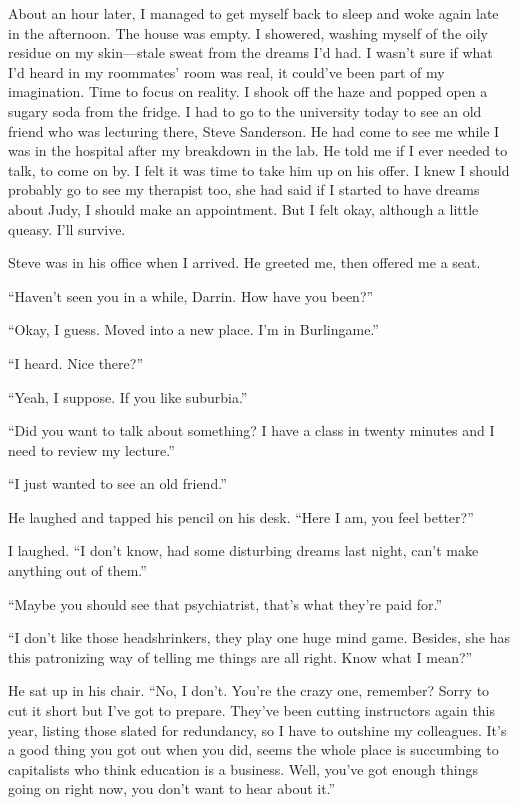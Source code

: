 About an hour later, I managed to get myself back to sleep and woke
again late in the afternoon. The house was empty. I showered, washing
myself of the oily residue on my skin---stale sweat from the dreams I'd
had. I wasn't sure if what I'd heard in my roommates' room was real, it
could've been part of my imagination. Time to focus on reality. I shook
off the haze and popped open a sugary soda from the fridge. I had to go
to the university today to see an old friend who was lecturing there,
Steve Sanderson. He had come to see me while I was in the hospital after
my breakdown in the lab. He told me if I ever needed to talk, to come on
by. I felt it was time to take him up on his offer. I knew I should
probably go to see my therapist too, she had said if I started to have
dreams about Judy, I should make an appointment. But I felt okay,
although a little queasy. I'll survive.

Steve was in his office when I arrived. He greeted me, then offered me a
seat.

``Haven't seen you in a while, Darrin. How have you been?''

``Okay, I guess. Moved into a new place. I'm in Burlingame.''

``I heard. Nice there?''

``Yeah, I suppose. If you like suburbia.''

``Did you want to talk about something? I have a class in twenty minutes
and I need to review my lecture.''

``I just wanted to see an old friend.''

He laughed and tapped his pencil on his desk. ``Here I am, you feel
better?''

I laughed. ``I don't know, had some disturbing dreams last night, can't
make anything out of them.''

``Maybe you should see that psychiatrist, that's what they're paid
for.''

``I don't like those headshrinkers, they play one huge mind game.
Besides, she has this patronizing way of telling me things are all
right. Know what I mean?''

He sat up in his chair. ``No, I don't. You're the crazy one, remember?
Sorry to cut it short but I've got to prepare. They've been cutting
instructors again this year, listing those slated for redundancy, so I
have to outshine my colleagues. It's a good thing you got out when you
did, seems the whole place is succumbing to capitalists who think
education is a business. Well, you've got enough things going on right
now, you don't want to hear about it.''

